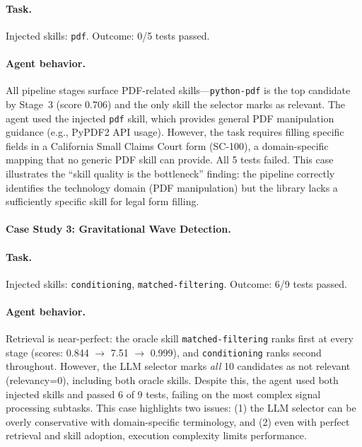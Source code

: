 \documentclass[11pt]{article}
\begin{document}
\paragraph{Task.} Injected skills: \texttt{pdf}. Outcome: 0/5 tests passed.

\begin{table}[t]
  \centering
  \caption{Pipeline progression for \texttt{court-form-filling}.}
  \label{tab:case_study_2}
  
\end{table}

\paragraph{Agent behavior.}
All pipeline stages surface PDF-related skills---\texttt{python-pdf} is the top candidate by Stage~3 (score 0.706) and the only skill the selector marks as relevant.
The agent used the injected \texttt{pdf} skill, which provides general PDF manipulation guidance (e.g., PyPDF2 API usage).
However, the task requires filling specific fields in a California Small Claims Court form (SC-100), a domain-specific mapping that no generic PDF skill can provide.
All 5 tests failed.
This case illustrates the ``skill quality is the bottleneck'' finding: the pipeline correctly identifies the technology domain (PDF manipulation) but the library lacks a sufficiently specific skill for legal form filling.

\paragraph{Case Study 3: Gravitational Wave Detection.}
\label{sec:case_study_3}

\paragraph{Task.}
Injected skills: \texttt{conditioning}, \texttt{matched-filtering}.
Outcome: 6/9 tests passed.

\begin{table}[t]
  \centering
  \caption{Pipeline progression for \texttt{gravitational-wave-detection}.}
  \label{tab:case_study_3}
  
\end{table}

\paragraph{Agent behavior.}
Retrieval is near-perfect: the oracle skill \texttt{matched-filtering} ranks first at every stage (scores: 0.844 $\rightarrow$ 7.51 $\rightarrow$ 0.999), and \texttt{conditioning} ranks second throughout.
However, the LLM selector marks \emph{all} 10 candidates as not relevant (relevancy=0), including both oracle skills.
Despite this, the agent used both injected skills and passed 6 of 9 tests, failing on the most complex signal processing subtasks.
This case highlights two issues: (1) the LLM selector can be overly conservative with domain-specific terminology, and (2) even with perfect retrieval and skill adoption, execution complexity limits performance.
\end{document}
